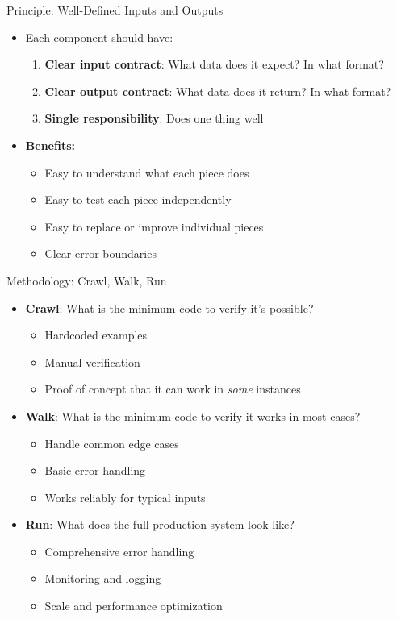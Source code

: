 \documentclass[aspectratio=169]{beamer}
\begin{document}
\begin{frame}{Principle: Well-Defined Inputs and Outputs}
\begin{itemize}
    \item Each component should have:
    \begin{enumerate}
        \item \textbf{Clear input contract}: What data does it expect? In what format?
        \item \textbf{Clear output contract}: What data does it return? In what format?
        \item \textbf{Single responsibility}: Does one thing well
    \end{enumerate}
    \vspace{0.3cm}
    \item \textbf{Benefits:}
    \begin{itemize}
        \item Easy to understand what each piece does
        \item Easy to test each piece independently
        \item Easy to replace or improve individual pieces
        \item Clear error boundaries
    \end{itemize}
\end{itemize}
\end{frame}

\begin{frame}{Methodology: Crawl, Walk, Run}
\begin{itemize}
    \item \textbf{Crawl}: What is the minimum code to verify it's possible?
    \begin{itemize}
        \item Hardcoded examples
        \item Manual verification
        \item Proof of concept that it can work in \textit{some} instances
    \end{itemize}
    \item \textbf{Walk}: What is the minimum code to verify it works in most cases?
    \begin{itemize}
        \item Handle common edge cases
        \item Basic error handling
        \item Works reliably for typical inputs
    \end{itemize}
    \item \textbf{Run}: What does the full production system look like?
    \begin{itemize}
        \item Comprehensive error handling
        \item Monitoring and logging
        \item Scale and performance optimization
    \end{itemize}
\end{itemize}
\end{frame}
\end{document}
